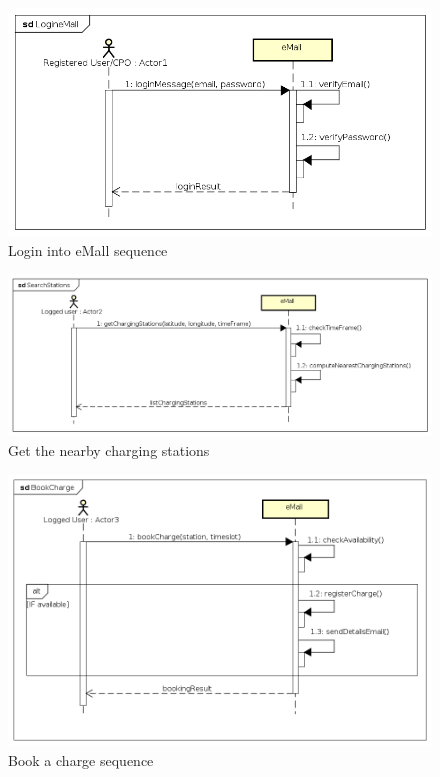 \begin{figure}[!h]
    \begin{center}
        \includegraphics[keepaspectratio, width=16cm]{Sequence/LoginEMall.png}
        \caption{Login into \ac{eMall} sequence}
    \end{center}
\end{figure}
\begin{figure}[!h]
    \begin{center}
        \includegraphics[keepaspectratio, width=16cm]{Sequence/SearchStations.png}
        \caption{Get the nearby charging stations}
    \end{center}
\end{figure}
\begin{figure}[!h]
    \begin{center}
        \includegraphics[keepaspectratio, width=16cm]{Sequence/BookCharge.png}
        \caption{Book a charge sequence}
    \end{center}
\end{figure}
